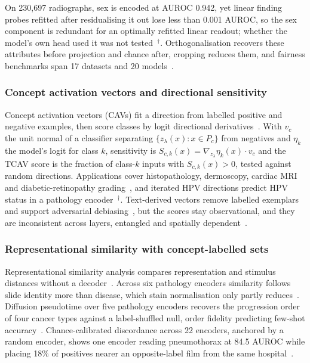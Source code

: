 On 230,697 radiographs, sex is encoded at AUROC 0.942, yet linear finding probes refitted after residualising
it out lose less than 0.001 AUROC, so the sex component is redundant for an optimally refitted linear readout;
whether the model's own head used it was not tested~\cite{kim2026encoding}$^{\dagger}$. Orthogonalisation recovers these attributes before projection and chance after, cropping reduces them, and
fairness benchmarks span 17 datasets and 20
models~\cite{weber2023posthoc,sutariya2026impact,jin2024fairmedfm,kauffmann2024explainable}.

\subsubsection{Concept activation vectors and directional sensitivity}

Concept activation vectors (CAVs) fit a direction from labelled positive and negative examples, then
score classes by logit directional derivatives~\cite{kim2018interpretability}. With $v_c$ the unit
normal of a classifier separating $\{z_\lambda(x):x\in P_c\}$ from negatives and $\eta_k$ the model's logit
for class $k$, sensitivity is $S_{c,k}(x)=\nabla_{z_\lambda}\eta_k(x)\cdot v_c$ and the TCAV score is
the fraction of class-$k$ inputs with $S_{c,k}(x)>0$, tested against random directions. Applications cover histopathology, dermoscopy, cardiac MRI and diabetic-retinopathy
grading~\cite{graziani2018regression,graziani2020concept,lucieri2020interpretability,clough2019global,stors2024looking},
and iterated HPV directions predict HPV status in a pathology
encoder~\cite{hieromnimon2025analysis}$^{\dagger}$. Text-derived vectors remove labelled exemplars and support
adversarial debiasing~\cite{nicolson2024textcavs,correa2023efficient}, but the scores stay observational, and
they are inconsistent across layers, entangled and spatially dependent~\cite{nicolson2024explaining}.

\subsubsection{Representational similarity with concept-labelled sets}

Representational similarity analysis compares representation and stimulus distances without a
decoder~\cite{kriegeskorte2008representational}. Across six pathology encoders similarity follows
slide identity more than disease, which stain normalisation only partly
reduces~\cite{mishra2025comparing}. Diffusion pseudotime over five pathology encoders recovers the
progression order of four cancer types against a label-shuffled null, order fidelity predicting
few-shot accuracy~\cite{vig2026do}. Chance-calibrated discordance across 22 encoders, anchored by a random encoder, shows one encoder reading
pneumothorax at 84.5 AUROC while placing 18\% of positives nearer an opposite-label film from the same
hospital~\cite{arasteh2026candor}.


